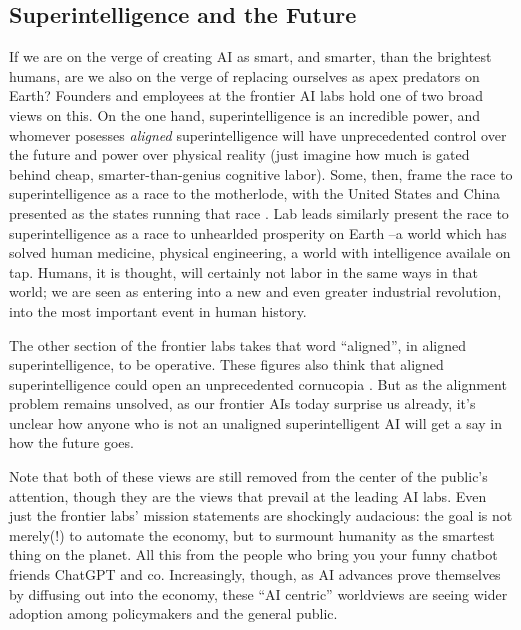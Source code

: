 \subsection{Superintelligence and the Future}
If we are on the verge of creating AI as smart, and smarter, than the brightest
humans, are we also on the verge of replacing ourselves as apex predators on
Earth? Founders and employees at the frontier AI labs hold one of two broad
views on this. On the one hand, superintelligence is an incredible power, and
whomever posesses \emph{aligned} superintelligence will have unprecedented
control over the future and power over physical reality (just imagine how much
is gated behind cheap, smarter-than-genius cognitive labor). Some, then, frame
the race to superintelligence as a race to the motherlode, with the United
States and China presented as the states running that race
\cite{aschenbrenner2024situational}. Lab leads similarly present the race to
superintelligence as a race to unhearlded prosperity on Earth
\cite{altman2024intelligence,amodei2024grace}--a world which has solved human
medicine, physical engineering, a world with intelligence availale on tap.
Humans, it is thought, will certainly not labor in the same ways in that world;
we are seen as entering into a new and even greater industrial revolution, into
the most important event in human history.

The other section of the frontier labs takes that word ``aligned'', in aligned
superintelligence, to be operative. These figures also think that aligned
superintelligence could open an unprecedented cornucopia
\cite{bostrom2024utopia}. But as the alignment problem remains unsolved, as our
frontier AIs today surprise us already, it's unclear how anyone who is not an
unaligned superintelligent AI will get a say in how the future goes.

Note that both of these views are still removed from the center of the public's
attention, though they are the views that prevail at the leading AI labs. Even
just the frontier labs' mission statements are shockingly audacious: the goal
is not merely(!) to automate the economy, but to surmount humanity as the
smartest thing on the planet. All this from the people who bring you your funny
chatbot friends ChatGPT and co. Increasingly, though, as AI advances prove
themselves by diffusing out into the economy, these ``AI centric'' worldviews
are seeing wider adoption among policymakers and the general public.
